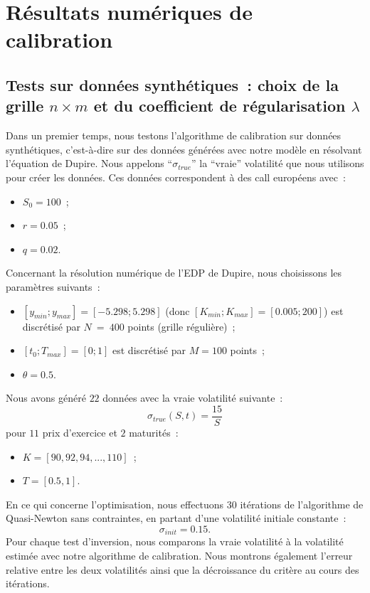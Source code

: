 \section{R\'esultats num\'eriques de calibration}
\label{SEC:RESULTATS}

\subsection{Tests sur donn\'ees synth\'etiques~: choix de 
la grille $n \times m$ et du coefficient de r\'egularisation 
$\lambda$}

Dans un premier temps, nous testons l'algorithme de calibration 
sur donn\'ees synth\'etiques, c'est-\`a-dire sur des donn\'ees 
g\'en\'er\'ees avec notre mod\`ele en r\'esolvant 
l'\'equation de Dupire. Nous appelons ``$\sigma_{true}$'' 
la ``vraie'' volatilit\'e que nous utilisons pour 
cr\'eer les donn\'ees.
Ces donn\'ees correspondent \`a des call europ\'eens avec~:
\begin{itemize}
\item
$S_0 = 100$~;
\item
$r = 0.05$~;
\item
$q = 0.02$.
\end{itemize}
Concernant la r\'esolution num\'erique de l'EDP de Dupire, 
nous choisissons les param\`etres suivants~:
\begin{itemize}
\item
$\left[y_{min};y_{max}\right] = [-5.298;5.298]$ 
(donc $\left[K_{min};K_{max}\right] = [0.005;200]$) est 
discr\'etis\'e par $N~=~400$ points (grille r\'eguli\`ere)~;
\item
$\left[t_0;T_{max}\right] = [0;1]$ est discr\'etis\'e 
par $M = 100$ points~;
\item
$\theta = 0.5$.
\end{itemize}
Nous avons g\'en\'er\'e $22$ donn\'ees avec la vraie volatilit\'e 
suivante~:
$$
\sigma_{true}(S,t) = \displaystyle\frac{15}{S}
$$
pour $11$ prix d'exercice et $2$ maturit\'es~:
\begin{itemize}
\item 
$K = [90,92,94,...,110]$~;
\item
$T = [0.5,1]$.
\end{itemize}
En ce qui concerne l'optimisation, nous effectuons $30$ it\'erations 
de l'algorithme de Quasi-Newton sans contraintes, en partant d'une 
volatilit\'e initiale constante~:
$$
\sigma_{init} = 0.15.
$$
Pour chaque test d'inversion, nous comparons la vraie volatilit\'e 
\`a la volatilit\'e estim\'ee avec notre algorithme de calibration. 
Nous montrons \'egalement l'erreur relative entre les deux 
volatilit\'es ainsi que la d\'ecroissance du crit\`ere au cours 
des it\'erations.


